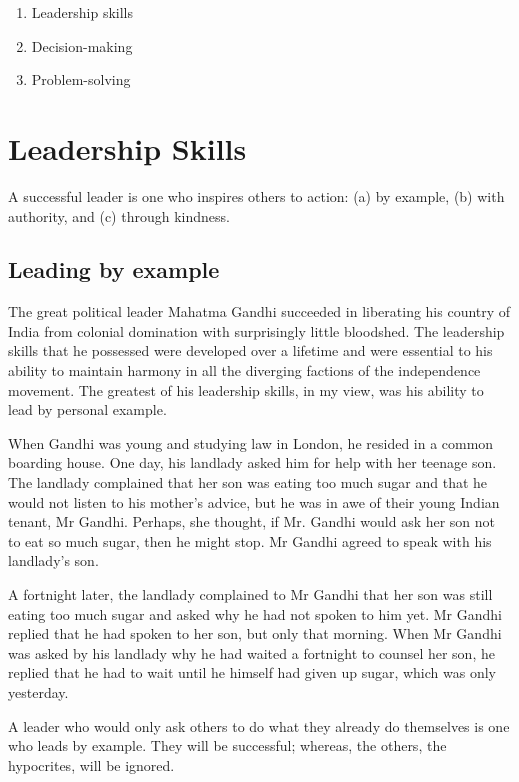 \documentclass[11pt, openany]{book}
\begin{document}
\begin{enumerate}
\item Leadership skills
\item Decision-making
\item Problem-solving
\end{enumerate}

\chapter{Leadership Skills}

A successful leader is one who inspires others to action: (a) by example, (b) with authority, and (c) through kindness.

\section{Leading by example}

The great political leader Mahatma Gandhi succeeded in liberating his country of India from colonial domination with surprisingly little bloodshed. The leadership skills that he possessed were developed over a lifetime and were essential to his ability to maintain harmony in all the diverging factions of the independence movement. The greatest of his leadership skills, in my view, was his ability to lead by personal example.

When Gandhi was young and studying law in London, he resided in a common boarding house. One day, his landlady asked him for help with her teenage son. The landlady complained that her son was eating too much sugar and that he would not listen to his mother’s advice, but he was in awe of their young Indian tenant, Mr Gandhi. Perhaps, she thought, if Mr. Gandhi would ask her son not to eat so much sugar, then he might stop. Mr Gandhi agreed to speak with his landlady’s son.

A fortnight later, the landlady complained to Mr Gandhi that her son was still eating too much sugar and asked why he had not spoken to him yet. Mr Gandhi replied that he had spoken to her son, but only that morning. When Mr Gandhi was asked by his landlady why he had waited a fortnight to counsel her son, he replied that he had to wait until he himself had given up sugar, which was only yesterday.

A leader who would only ask others to do what they already do themselves is one who leads by example. They will be successful; whereas, the others, the hypocrites, will be ignored.
\end{document}
